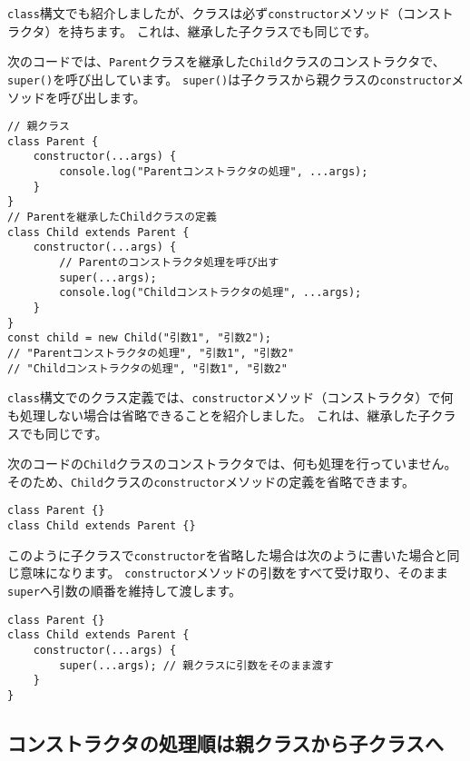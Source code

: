 \texttt{class}構文でも紹介しましたが、クラスは必ず\texttt{constructor}メソッド（コンストラクタ）を持ちます。
これは、継承した子クラスでも同じです。

次のコードでは、\texttt{Parent}クラスを継承した\texttt{Child}クラスのコンストラクタで、\texttt{super()}を呼び出しています。
\texttt{super()}は子クラスから親クラスの\texttt{constructor}メソッドを呼び出します。

\begin{lstlisting}
// 親クラス
class Parent {
    constructor(...args) {
        console.log("Parentコンストラクタの処理", ...args);
    }
}
// Parentを継承したChildクラスの定義
class Child extends Parent {
    constructor(...args) {
        // Parentのコンストラクタ処理を呼び出す
        super(...args);
        console.log("Childコンストラクタの処理", ...args);
    }
}
const child = new Child("引数1", "引数2");
// "Parentコンストラクタの処理", "引数1", "引数2"
// "Childコンストラクタの処理", "引数1", "引数2"
\end{lstlisting}

\texttt{class}構文でのクラス定義では、\texttt{constructor}メソッド（コンストラクタ）で何も処理しない場合は省略できることを紹介しました。
これは、継承した子クラスでも同じです。

次のコードの\texttt{Child}クラスのコンストラクタでは、何も処理を行っていません。
そのため、\texttt{Child}クラスの\texttt{constructor}メソッドの定義を省略できます。

\begin{lstlisting}
class Parent {}
class Child extends Parent {}
\end{lstlisting}

このように子クラスで\texttt{constructor}を省略した場合は次のように書いた場合と同じ意味になります。
\texttt{constructor}メソッドの引数をすべて受け取り、そのまま\texttt{super}へ引数の順番を維持して渡します。

\begin{lstlisting}
class Parent {}
class Child extends Parent {
    constructor(...args) {
        super(...args); // 親クラスに引数をそのまま渡す
    }
}
\end{lstlisting}

\hypertarget{constructor-order}{%
\subsection{コンストラクタの処理順は親クラスから子クラスへ}\label{constructor-order}}

